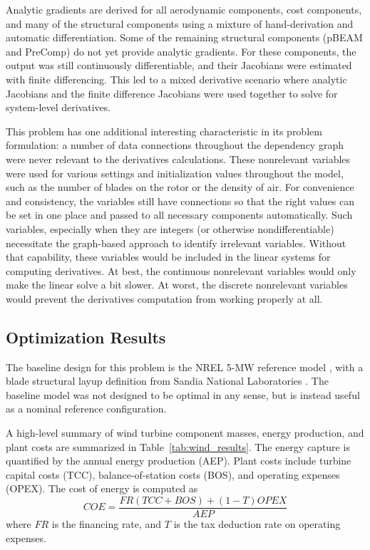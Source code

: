 \documentclass[]{aiaa-tc} %
\begin{document}
    Analytic gradients are derived for all aerodynamic components, cost components, and many of the
    structural components using a mixture of hand-derivation and automatic differentiation.  Some of
    the remaining structural components (pBEAM and PreComp) do not yet provide analytic gradients.
    For these components, the output was still continuously differentiable, and their Jacobians were
    estimated with finite differencing.  This led to a mixed derivative scenario where analytic
    Jacobians and the finite difference Jacobians were used together to solve for system-level
    derivatives.

    This problem has one additional interesting characteristic in its
    problem formulation: a number of data connections throughout the dependency
    graph were never relevant to the derivatives calculations. These nonrelevant
    variables were used for various settings and initialization values throughout the
    model, such as the number of blades on the rotor or the density of air. For convenience
    and consistency, the variables still have connections so that the right values can
    be set in one place and passed to all necessary components automatically.
    Such variables, especially when they are integers (or otherwise nondifferentiable)
    necessitate the graph-based approach to identify irrelevant variables. Without that capability, these
    variables would be included in the linear systems for computing derivatives. At best,
    the continuous nonrelevant variables would only make the linear solve a bit slower.
    At worst, the discrete nonrelevant variables would prevent the derivatives computation from working properly at all.


    \subsection{Optimization Results}

    The baseline design for this problem is the NREL 5-MW reference model \cite{Jonkman2009}, with a blade structural layup definition from Sandia National Laboratories \cite{Resor2013}.  The baseline model was not designed to be optimal in any sense, but is instead useful as a nominal reference configuration.

    A high-level summary of wind turbine component masses, energy production, and plant costs are summarized in Table~\ref{tab:wind_results}.  The energy capture is quantified by the annual energy production (AEP).  Plant costs include turbine capital costs (TCC), balance-of-station costs (BOS), and operating expenses (OPEX).  The cost of energy is computed as
    \begin{equation}
    COE = \frac {FR (TCC + BOS) + (1-T) OPEX} {AEP}
    \end{equation}
    where $FR$ is the financing rate, and $T$ is the tax deduction rate on operating expenses.
\end{document}
